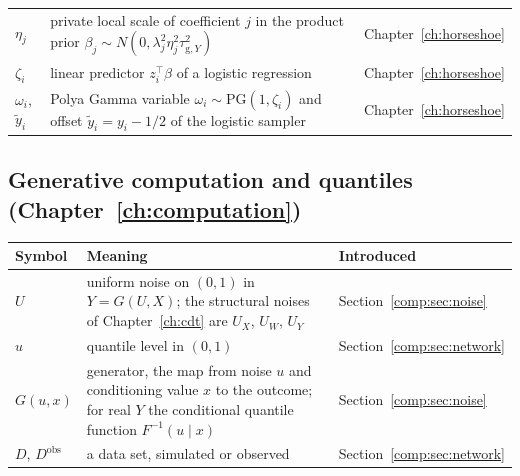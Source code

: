 {\noindent\small\centering
\setlength{\tabcolsep}{4pt}\renewcommand{\arraystretch}{1.1}
\begin{tabular}{>{\raggedright\arraybackslash}p{1.0in}>{\raggedright\arraybackslash}p{2.15in}>{\raggedright\arraybackslash}p{0.95in}}
$\eta_j$ & private local scale of coefficient $j$ in the product prior $\beta_j \sim N(0, \lambda_j^2\eta_j^2\tau_{\mathrm{g},Y}^2)$ & Chapter~\ref{ch:horseshoe} \\
$\zeta_i$ & linear predictor $z_i^\top\beta$ of a logistic regression & Chapter~\ref{ch:horseshoe} \\
$\omega_i$, $\tilde y_i$ & Polya Gamma variable $\omega_i \sim \mathrm{PG}(1, \zeta_i)$ and offset $\tilde y_i = y_i - 1/2$ of the logistic sampler & Chapter~\ref{ch:horseshoe} \\
\bottomrule
\end{tabular}\par}

\subsection*{Generative computation and quantiles (Chapter~\ref{ch:computation})}

{\noindent\small\centering
\setlength{\tabcolsep}{4pt}\renewcommand{\arraystretch}{1.1}
\begin{tabular}{>{\raggedright\arraybackslash}p{1.0in}>{\raggedright\arraybackslash}p{2.15in}>{\raggedright\arraybackslash}p{0.95in}}
\toprule
Symbol & Meaning & Introduced \\
\midrule
$U$ & uniform noise on $(0, 1)$ in $Y = G(U, X)$; the structural noises of Chapter~\ref{ch:cdt} are $U_X$, $U_W$, $U_Y$ & Section~\ref{comp:sec:noise} \\
$u$ & quantile level in $(0, 1)$ & Section~\ref{comp:sec:network} \\
$G(u, x)$ & generator, the map from noise $u$ and conditioning value $x$ to the outcome; for real $Y$ the conditional quantile function $F^{-1}(u \mid x)$ & Section~\ref{comp:sec:noise} \\
$D$, $D^{\mathrm{obs}}$ & a data set, simulated or observed & Section~\ref{comp:sec:network} \\
\end{tabular}\par}

